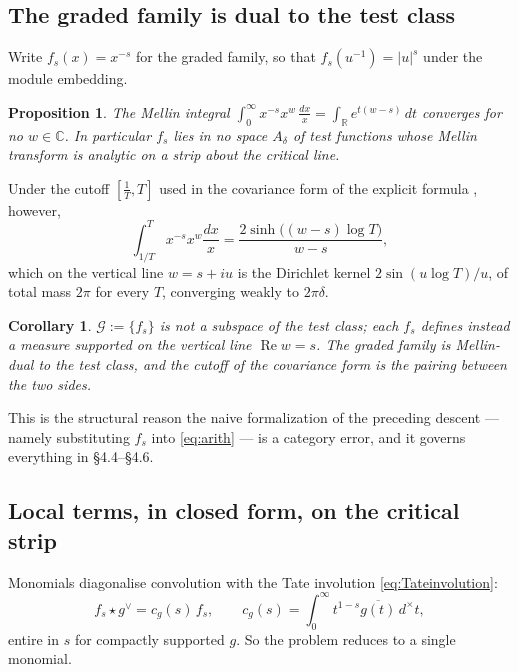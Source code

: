 \documentclass[11pt]{amsart}
\newtheorem{proposition}[theorem]{Proposition}
\newtheorem{corollary}[theorem]{Corollary}
\theoremstyle{definition}
\theoremstyle{remark}
\newcommand{\C}{\mathbb C}
\newcommand{\R}{\mathbb R}
\newcommand{\Rel}{\operatorname{Re}}
\newcommand{\Gr}{\mathcal G}
\begin{document}
\subsection{The graded family is dual to the test class}

Write $f_s(x)=x^{-s}$ for the graded family, so that $f_s(u^{-1})=|u|^{s}$
under the module embedding.

\begin{proposition}\label{prop:nomellin}
The Mellin integral $\int_0^\infty x^{-s}x^{w}\,\frac{dx}{x}
=\int_\R e^{t(w-s)}\,dt$ converges for no $w\in\C$.  In particular $f_s$
lies in no space $A_\delta$ of test functions whose Mellin transform is
analytic on a strip about the critical line.
\end{proposition}

Under the cutoff $[\tfrac1T,T]$ used in the covariance form of the explicit
formula \cite{BombieriLagarias,Lagarias2007}, however,
\begin{equation}
 \int_{1/T}^{T}x^{-s}x^{w}\frac{dx}{x}
 =\frac{2\sinh\big((w-s)\log T\big)}{w-s},
\end{equation}
which on the vertical line $w=s+iu$ is the Dirichlet kernel
$2\sin(u\log T)/u$, of total mass $2\pi$ for every $T$, converging weakly to
$2\pi\delta$.

\begin{corollary}\label{cor:duality}
$\Gr:=\{f_s\}$ is not a subspace of the test class; each $f_s$ defines
instead a measure supported on the vertical line $\Rel w=s$.  The graded
family is Mellin-dual to the test class, and the cutoff of the covariance
form is the pairing between the two sides.
\end{corollary}

This is the structural reason the naive formalization of the preceding descent --- namely
substituting $f_s$ into \eqref{eq:arith} --- is a category error, and it
governs everything in \S4.4--\S4.6.

\subsection{Local terms, in closed form, on the critical strip}

Monomials diagonalise convolution with the Tate involution
\eqref{eq:Tateinvolution}:
\begin{equation}\label{eq:eigen}
 f_s\star g^\vee=c_g(s)\,f_s,
 \qquad
 c_g(s)=\int_0^\infty t^{1-s}\overline{g(t)}\,d^\times t,
\end{equation}
entire in $s$ for compactly supported $g$.  So the problem reduces to a
single monomial.
\end{document}
